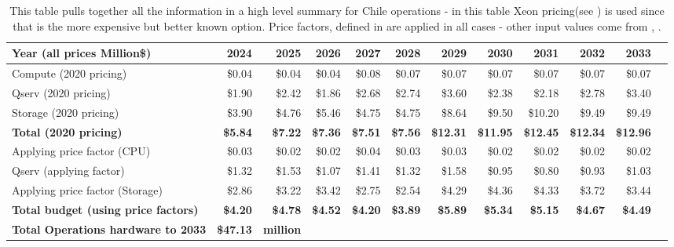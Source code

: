 \tiny \begin{longtable} { |p{}  |r  |r  |r  |r  |r  |r  |r  |r  |r  |r  |r |} 
\caption{This table pulls together all the information in a high level summary for Chile operations - in this table Xeon pricing(see ) is used since that is the more expensive but better known option. Price factors, defined in  are applied in all cases - other input values come from , .
 \label{tab:opsSumChile}}\\ 
\hline 
\textbf{Year  (all prices Million\$)}&\textbf{2024}&\textbf{2025}&\textbf{2026}&\textbf{2027}&\textbf{2028}&\textbf{2029}&\textbf{2030}&\textbf{2031}&\textbf{2032}&\textbf{2033} \\ \hline
{Compute (2020 pricing)}&{\$0.04}&{\$0.04}&{\$0.04}&{\$0.08}&{\$0.07}&{\$0.07}&{\$0.07}&{\$0.07}&{\$0.07}&{\$0.07} \\ \hline
{Qserv (2020 pricing)}&{\$1.90}&{\$2.42}&{\$1.86}&{\$2.68}&{\$2.74}&{\$3.60}&{\$2.38}&{\$2.18}&{\$2.78}&{\$3.40} \\ \hline
{Storage (2020 pricing)}&{\$3.90}&{\$4.76}&{\$5.46}&{\$4.75}&{\$4.75}&{\$8.64}&{\$9.50}&{\$10.20}&{\$9.49}&{\$9.49} \\ \hline
\textbf{Total (2020 pricing)}&\textbf{\$5.84}&\textbf{\$7.22}&\textbf{\$7.36}&\textbf{\$7.51}&\textbf{\$7.56}&\textbf{\$12.31}&\textbf{\$11.95}&\textbf{\$12.45}&\textbf{\$12.34}&\textbf{\$12.96} \\ \hline
{Applying price factor (CPU)}&{\$0.03}&{\$0.02}&{\$0.02}&{\$0.04}&{\$0.03}&{\$0.03}&{\$0.02}&{\$0.02}&{\$0.02}&{\$0.02} \\ \hline
{Qserv (applying factor)}&{\$1.32}&{\$1.53}&{\$1.07}&{\$1.41}&{\$1.32}&{\$1.58}&{\$0.95}&{\$0.80}&{\$0.93}&{\$1.03} \\ \hline
{Applying price factor (Storage)}&{\$2.86}&{\$3.22}&{\$3.42}&{\$2.75}&{\$2.54}&{\$4.29}&{\$4.36}&{\$4.33}&{\$3.72}&{\$3.44} \\ \hline
\textbf{Total budget (using price factors)}&\textbf{\$4.20}&\textbf{\$4.78}&\textbf{\$4.52}&\textbf{\$4.20}&\textbf{\$3.89}&\textbf{\$5.89}&\textbf{\$5.34}&\textbf{\$5.15}&\textbf{\$4.67}&\textbf{\$4.49} \\ \hline
\textbf{Total Operations hardware to 2033}&\textbf{\$47.13}&\textbf{million}&&&&&&&& \\ \hline
\end{longtable} \normalsize

